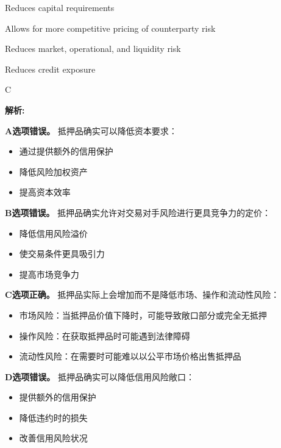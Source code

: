 \documentclass{article}
\newenvironment{explanation}
{\textbf{解析:}\par}
{\par}
\begin{document}
\begin{choices}
    \item Reduces capital requirements
    \item Allows for more competitive pricing of counterparty risk
    \item Reduces market, operational, and liquidity risk
    \item Reduces credit exposure
\end{choices}

\begin{correctanswer}
    C
\end{correctanswer}

\begin{explanation}
    \textbf{A选项错误。}
    抵押品确实可以降低资本要求：
    \begin{itemize}
        \item 通过提供额外的信用保护
        \item 降低风险加权资产
        \item 提高资本效率
    \end{itemize}

    \textbf{B选项错误。}
    抵押品确实允许对交易对手风险进行更具竞争力的定价：
    \begin{itemize}
        \item 降低信用风险溢价
        \item 使交易条件更具吸引力
        \item 提高市场竞争力
    \end{itemize}

    \textbf{C选项正确。}
    抵押品实际上会增加而不是降低市场、操作和流动性风险：
    \begin{itemize}
        \item 市场风险：当抵押品价值下降时，可能导致敞口部分或完全无抵押
        \item 操作风险：在获取抵押品时可能遇到法律障碍
        \item 流动性风险：在需要时可能难以以公平市场价格出售抵押品
    \end{itemize}

    \textbf{D选项错误。}
    抵押品确实可以降低信用风险敞口：
    \begin{itemize}
        \item 提供额外的信用保护
        \item 降低违约时的损失
        \item 改善信用风险状况
    \end{itemize}
\end{explanation}
\end{document}
